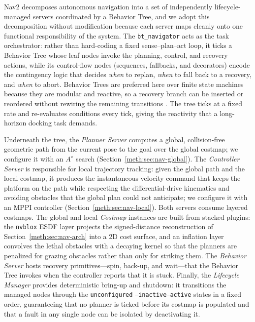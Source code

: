 Nav2 decomposes autonomous navigation into a set of independently lifecycle-managed servers
coordinated by a Behavior Tree, and we adopt this decomposition without modification because
each server maps cleanly onto one functional responsibility of the system. The
\texttt{bt\_navigator} acts as the task orchestrator: rather than hard-coding a fixed
sense--plan--act loop, it ticks a Behavior Tree whose leaf nodes invoke the planning, control,
and recovery actions, while its control-flow nodes (sequences, fallbacks, and decorators)
encode the contingency logic that decides \emph{when} to replan, \emph{when} to fall back to a
recovery, and \emph{when} to abort. Behavior Trees are preferred here over finite state machines
because they are modular and reactive, so a recovery branch can be inserted or reordered without
rewiring the remaining transitions \cite{colledanchise2018bt}. The tree ticks at a fixed rate and
re-evaluates conditions every tick, giving the reactivity that a long-horizon docking task
demands.

Underneath the tree, the \emph{Planner Server} computes a global, collision-free geometric path
from the current pose to the goal over the global costmap; we configure it with an $A^{\star}$
search (Section~\ref{meth:sec:nav-global}). The \emph{Controller Server} is responsible for local trajectory
tracking: given the global path and the local costmap, it produces the instantaneous velocity
command that keeps the platform on the path while respecting the differential-drive kinematics
and avoiding obstacles that the global plan could not anticipate; we configure it with an MPPI
controller (Section~\ref{meth:sec:nav-local}). Both servers consume layered costmaps. The global and local
\emph{Costmap} instances are built from stacked plugins: the \texttt{nvblox} ESDF layer projects
the signed-distance reconstruction of Section~\ref{meth:sec:nav-arch} into a 2D cost surface, and an
inflation layer convolves the lethal obstacles with a decaying kernel so that the planners are
penalized for grazing obstacles rather than only for striking them. The \emph{Behavior Server}
hosts recovery primitives---spin, back-up, and wait---that the Behavior Tree invokes when the
controller reports that it is stuck. Finally, the \emph{Lifecycle Manager} provides deterministic
bring-up and shutdown: it transitions the managed nodes through the \texttt{unconfigured}%
--\texttt{inactive}--\texttt{active} states in a fixed order, guaranteeing that no planner is
ticked before its costmap is populated and that a fault in any single node can be isolated by
deactivating it. 

